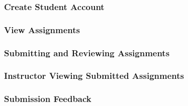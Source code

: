 \documentclass{article}
\begin{document}
\subsubsection{Create Student Account}

\subsubsection{View Assignments}

\subsubsection{Submitting and Reviewing Assignments}

\subsubsection{Instructor Viewing Submitted Assignments}

\subsubsection{Submission Feedback}








\end{document}
